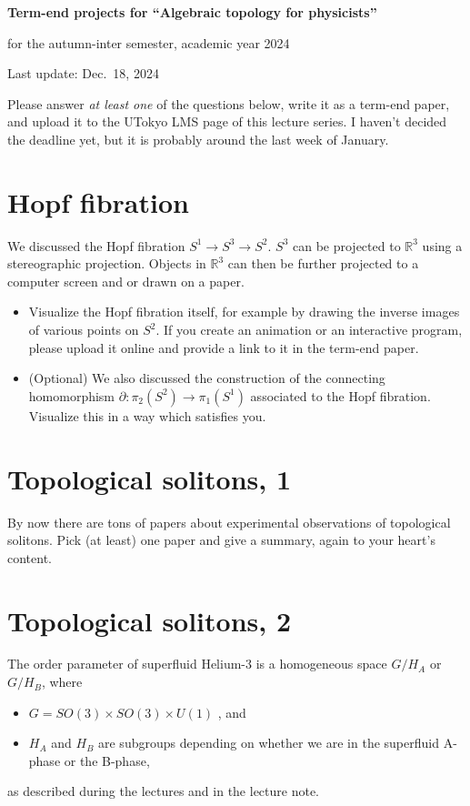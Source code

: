 \documentclass[11pt,a4paper]{article}
\def\bR{\mathbb{R}}
\begin{document}
\centerline{\Large\bfseries Term-end projects for ``Algebraic topology for physicists''}

\bigskip

\centerline{for the autumn-inter semester, academic year 2024 }

\hbox{}\hfill Last update: Dec.~18, 2024

\bigskip

Please answer \emph{at least one} of the questions below,
write it as a term-end paper,
and upload it to the UTokyo LMS page of this lecture series. 
I haven't decided the deadline yet, but it is probably around the last week of January.

\section{Hopf fibration}

We discussed the Hopf fibration $S^1\to S^3\to S^2$. 
$S^3$ can be projected to $\bR^3$ using a stereographic projection.
Objects in $\bR^3$ can then be further projected to a computer screen and or drawn on a paper.

\begin{itemize}
\item Visualize the Hopf fibration itself, for example by drawing the inverse images of various points on $S^2$.
If you create an animation or an interactive program, please upload it online and provide a link to it in the term-end paper.
\item (Optional) 
We also discussed the construction of the connecting homomorphism $\partial : \pi_2(S^2)\to \pi_1(S^1)$ associated to the Hopf fibration.
Visualize this in a way which satisfies you.
\end{itemize}

\section{Topological solitons, 1}

By now there are tons of papers about experimental observations of topological solitons.
Pick (at least) one paper and give a summary, again to your heart's content.

\section{Topological solitons, 2}

The order parameter of superfluid Helium-3 is a homogeneous space $G/H_A$ or $G/H_B$, where 
\begin{itemize}
\item $G=SO(3)\times SO(3)\times U(1)$ , and
\item $H_A$ and $H_B$ are subgroups depending on whether we are in the superfluid A-phase or the B-phase,
\end{itemize}
as described during the lectures and in the lecture note. 
\end{document}
